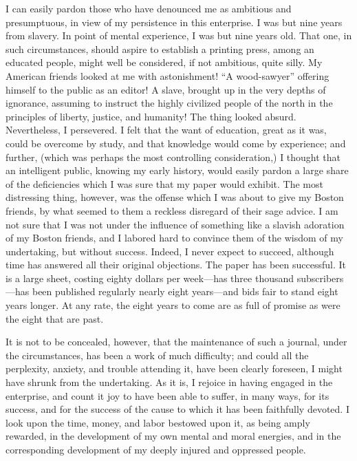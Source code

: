 I can easily pardon those who have denounced me {}as ambitious and
presumptuous, in view of my persistence in this enterprise. I was but
nine years from slavery. In point of mental experience, I was but nine
years old. That one, in such circumstances, should aspire to establish a
printing press, among an educated people, might well be considered, if
not ambitious, quite silly. My American friends looked at me with
astonishment! ``A wood-sawyer'' offering himself to the public as an
editor! A slave, brought up in the very depths of ignorance, assuming to
instruct the highly civilized people of the north in the principles of
liberty, justice, and humanity! The thing looked absurd. Nevertheless, I
persevered. I felt that the want of education, great as it was, could be
overcome by study, and that knowledge would come by experience; and
further, (which was perhaps the most controlling consideration,) I
thought that an intelligent public, knowing my early history, would
easily pardon a large share of the deficiencies which I was sure that my
paper would exhibit. The most distressing thing, however, was the
offense which I was about to give my Boston friends, by what seemed to
them a reckless disregard of their sage advice. I am not sure that I was
not under the influence of something like a slavish adoration of my
Boston friends, and I labored hard to convince them of the wisdom of my
undertaking, but without success. Indeed, I never expect to succeed,
although time has answered all their original objections. The paper has
been successful. It is a large sheet, costing eighty dollars per
week---has three thousand subscribers---has been published regularly
nearly eight {}years---and bids fair to stand eight years longer. At any
rate, the eight years to come are as full of promise as were the eight
that are past.

It is not to be concealed, however, that the maintenance of such a
journal, under the circumstances, has been a work of much difficulty;
and could all the perplexity, anxiety, and trouble attending it, have
been clearly foreseen, I might have shrunk from the undertaking. As it
is, I rejoice in having engaged in the enterprise, and count it joy to
have been able to suffer, in many ways, for its success, and for the
success of the cause to which it has been faithfully devoted. I look
upon the time, money, and labor bestowed upon it, as being amply
rewarded, in the development of my own mental and moral energies, and in
the corresponding development of my deeply injured and oppressed people.

